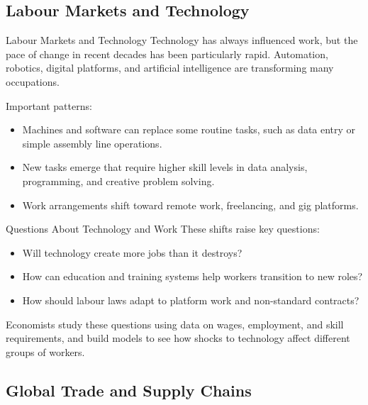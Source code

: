 \documentclass[aspectratio=169]{beamer}
\begin{document}
\subsection{Labour Markets and Technology}

\begin{frame}{Labour Markets and Technology}
  \transfade
  Technology has always influenced work, but the pace of change in recent decades has been
  particularly rapid. Automation, robotics, digital platforms, and artificial intelligence are
  transforming many occupations.

  \vspace{0.2cm}
  Important patterns:
  \begin{itemize}[<+->]
    \item Machines and software can replace some routine tasks, such as data entry or simple
    assembly line operations.
    \item New tasks emerge that require higher skill levels in data analysis, programming, and
    creative problem solving.
    \item Work arrangements shift toward remote work, freelancing, and gig platforms.
  \end{itemize}
\end{frame}

\begin{frame}{Questions About Technology and Work}
  \transfade
  These shifts raise key questions:

  \begin{itemize}[<+->]
    \item Will technology create more jobs than it destroys?
    \item How can education and training systems help workers transition to new roles?
    \item How should labour laws adapt to platform work and non-standard contracts?
  \end{itemize}

  \vspace{0.3cm}
  Economists study these questions using data on wages, employment, and skill requirements,
  and build models to see how shocks to technology affect different groups of workers.
\end{frame}

\subsection{Global Trade and Supply Chains}
\end{document}
